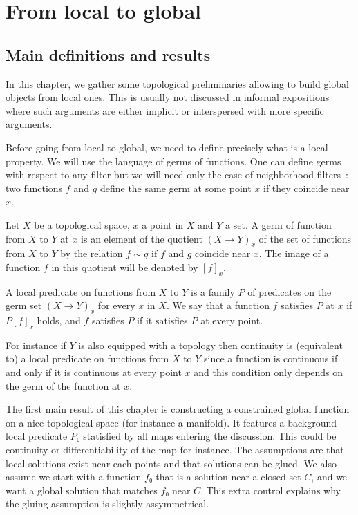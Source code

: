 \chapter{From local to global}%
\label{cha:from_local_to_global}

\section{Main definitions and results}%
\label{sec:Main definitions and results}


In this chapter, we gather some topological preliminaries allowing to build
global objects from local ones. This is usually not discussed in informal expositions
where such arguments are either implicit or interspersed with more specific arguments.

Before going from local to global, we need to define precisely what is a local
property. We will use the language of germs of functions.
One can define germs with respect to any filter but
we will need only the case of neighborhood filters~: two functions $f$ and $g$
define the same germ at some point $x$ if they coincide near $x$.

\begin{definition}\label{def:germ}\leanok
  Let $X$ be a topological space, $x$ a point in $X$ and $Y$ a set. A germ of function
  from $X$ to $Y$ at $x$ is an element of the quotient $(X → Y)_x$ of the set of functions
  from $X$ to $Y$ by the relation $f ∼ g$ if $f$ and $g$ coincide near $x$. The image
  of a function $f$ in this quotient will be denoted by $[f]_x$.

  A local predicate on functions from $X$ to $Y$ is a family $P$ of predicates on the
  germ set $(X → Y)_x$ for every $x$ in $X$. We say that a function $f$
  satisfies $P$ at $x$ if $P [f]_x$ holds, and $f$ satisfies $P$ if it
  satisfies $P$ at every point.
\end{definition}

For instance if $Y$ is also equipped with a topology then continuity is
(equivalent to) a local predicate on functions from $X$ to $Y$ since a function
is continuous if and only if it is continuous at every point $x$ and this
condition only depends on the germ of the function at $x$.

The first main result of this chapter is constructing a constrained global
function on a nice topological space (for instance a manifold). It features a
background local predicate $P₀$ statisfied by all maps entering the discussion.
This could be continuity or differentiability of the map for instance. The
assumptions are that local solutions exist near each points and that solutions
can be glued. We also assume we start with a function $f₀$ that is a solution
near a closed set $C$, and we want a global solution that matches $f₀$ near $C$.
This extra control explains why the gluing assumption is slightly assymmetrical.

